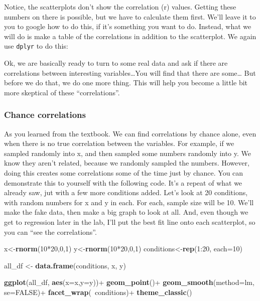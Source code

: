 \documentclass[]{book}
\newenvironment{Shaded}{\begin{snugshade}}{\end{snugshade}}
\newcommand{\KeywordTok}[1]{\textcolor[rgb]{0.13,0.29,0.53}{\textbf{{#1}}}}
\newcommand{\DataTypeTok}[1]{\textcolor[rgb]{0.13,0.29,0.53}{{#1}}}
\newcommand{\DecValTok}[1]{\textcolor[rgb]{0.00,0.00,0.81}{{#1}}}
\newcommand{\StringTok}[1]{\textcolor[rgb]{0.31,0.60,0.02}{{#1}}}
\newcommand{\OtherTok}[1]{\textcolor[rgb]{0.56,0.35,0.01}{{#1}}}
\newcommand{\NormalTok}[1]{{#1}}
\theoremstyle{definition}
\theoremstyle{definition}
\theoremstyle{definition}
\theoremstyle{remark}
\begin{document}
Notice, the scatterplots don't show the correlation (r) values. Getting
these numbers on there is possible, but we have to calculate them first.
We'll leave it to you to google how to do this, if it's something you
want to do. Instead, what we will do is make a table of the correlations
in addition to the scatterplot. We again use \texttt{dplyr} to do this:

Ok, we are basically ready to turn to some real data and ask if there
are correlations between interesting variables\ldots{}You will find that
there are some\ldots{} But before we do that, we do one more thing. This
will help you become a little bit more skeptical of these
``correlations''.

\subsubsection{Chance correlations}\label{chance-correlations}

As you learned from the textbook. We can find correlations by chance
alone, even when there is no true correlation between the variables. For
example, if we sampled randomly into x, and then sampled some numbers
randomly into y. We know they aren't related, because we randomly
sampled the numbers. However, doing this creates some correlations some
of the time just by chance. You can demonstrate this to yourself with
the following code. It's a repeat of what we already saw, jut with a few
more conditions added. Let's look at 20 conditions, with random numbers
for x and y in each. For each, sample size will be 10. We'll make the
fake data, then make a big graph to look at all. And, even though we get
to regression later in the lab, I'll put the best fit line onto each
scatterplot, so you can ``see the correlations''.

\begin{Shaded}
\begin{Highlighting}[]
\NormalTok{x<-}\KeywordTok{rnorm}\NormalTok{(}\DecValTok{10}\NormalTok{*}\DecValTok{20}\NormalTok{,}\DecValTok{0}\NormalTok{,}\DecValTok{1}\NormalTok{)}
\NormalTok{y<-}\KeywordTok{rnorm}\NormalTok{(}\DecValTok{10}\NormalTok{*}\DecValTok{20}\NormalTok{,}\DecValTok{0}\NormalTok{,}\DecValTok{1}\NormalTok{)}
\NormalTok{conditions<-}\KeywordTok{rep}\NormalTok{(}\DecValTok{1}\NormalTok{:}\DecValTok{20}\NormalTok{, }\DataTypeTok{each=}\DecValTok{10}\NormalTok{)}

\NormalTok{all_df <-}\StringTok{ }\KeywordTok{data.frame}\NormalTok{(conditions, x, y)}

\KeywordTok{ggplot}\NormalTok{(all_df, }\KeywordTok{aes}\NormalTok{(}\DataTypeTok{x=}\NormalTok{x,}\DataTypeTok{y=}\NormalTok{y))+}
\StringTok{  }\KeywordTok{geom_point}\NormalTok{()+}
\StringTok{  }\KeywordTok{geom_smooth}\NormalTok{(}\DataTypeTok{method=}\NormalTok{lm, }\DataTypeTok{se=}\OtherTok{FALSE}\NormalTok{)+}
\StringTok{  }\KeywordTok{facet_wrap}\NormalTok{(~conditions)+}
\StringTok{  }\KeywordTok{theme_classic}\NormalTok{()}
\end{Highlighting}
\end{Shaded}
\end{document}
